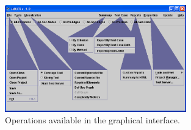 \begin{figure}[!ht]
\begin{center}
\includegraphics[width=0.7\textwidth]{fig/main-window-editted.eps}
\caption{\label{fig:tool}Operations available in the graphical
interface.}
\end{center}
\end{figure}
